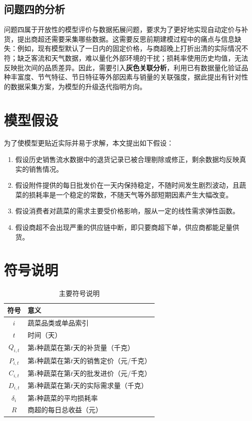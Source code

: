 \documentclass[withoutpreface]{cumcmthesis}
\begin{document}
\subsection{问题四的分析}
问题四属于开放性的模型评价与数据拓展问题，要求为了更好地实现自动定价与补货，提出商超还需要采集哪些数据。这需要反思前期建模过程中的痛点与信息缺失：例如，现有模型默认了一日内的固定价格，与商超晚上打折出清的实际情况不符；缺乏客流和天气数据，难以量化外部环境的干扰；损耗率使用历史均值，无法反映批次间的品质差异。因此，需要引入\textbf{灰色关联分析}，利用已有数据量化验证品种丰富度、节气特征、节日特征等外部因素与销量的关联强度，据此提出有针对性的数据采集方案，为模型的升级迭代指明方向。

\section{模型假设}
为了使模型更贴近实际并易于求解，本文提出如下假设：
\begin{enumerate}
    \item 假设历史销售流水数据中的退货记录已被合理剔除或修正，剩余数据均反映真实的销售情况。
    \item 假设附件提供的每日批发价在一天内保持稳定，不随时间发生剧烈波动，且蔬菜的损耗率是一个稳定的常数，不随天气等外部短期因素产生大幅改变。
    \item 假设消费者对蔬菜的需求主要受价格影响，服从一定的线性需求弹性函数。
    \item 假设商超不会出现严重的供应链中断，即只要商超下单，供应商都能足量供货。
\end{enumerate}

\section{符号说明}
\begin{table}[H]
\centering
\caption{主要符号说明}
\begin{tabular}{cp{8cm}}
\toprule
符号 & 意义 \\
\midrule
$i$ & 蔬菜品类或单品索引 \\
$t$ & 时间（天） \\
$Q_{i,t}$ & 第$i$种蔬菜在第$t$天的补货量（千克） \\
$P_{i,t}$ & 第$i$种蔬菜在第$t$天的销售定价（元/千克） \\
$C_{i,t}$ & 第$i$种蔬菜在第$t$天的批发进价（元/千克） \\
$D_{i,t}$ & 第$i$种蔬菜在第$t$天的实际需求量（千克） \\
$\delta_i$ & 第$i$种蔬菜的平均损耗率 \\
$R$ & 商超的每日总收益（元） \\
\bottomrule
\end{tabular}
\end{table}
\end{document}
